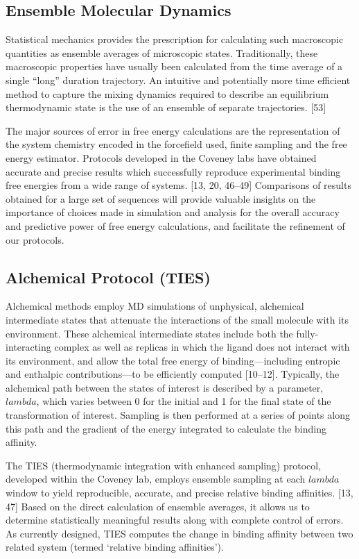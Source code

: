 \documentclass[conference]{IEEEtran}
\begin{document}
\subsection{Ensemble Molecular Dynamics}\label{sec:emd}

Statistical mechanics provides the prescription for calculating such macroscopic quantities as ensemble averages of microscopic states. Traditionally, these macroscopic properties have usually been calculated from the time average of a single “long” duration trajectory. An intuitive and potentially more time efficient method to capture the mixing dynamics required to describe an equilibrium thermodynamic state is the use of an ensemble of separate trajectories. [53]

The major sources of error in free energy calculations are the representation of the system chemistry encoded in the forcefield used, finite sampling and the free energy estimator. Protocols developed in the Coveney labs have obtained accurate and precise results which successfully reproduce experimental binding free energies from a wide range of systems. [13, 20, 46–49] Comparisons of results obtained for a large set of sequences will provide valuable insights on the importance of choices made in simulation and analysis for the overall accuracy and predictive power of free energy calculations, and facilitate the refinement of our protocols. 


\subsection{Alchemical Protocol (TIES)}\label{sec:ties}

Alchemical methods employ MD simulations of unphysical, alchemical intermediate states that attenuate the interactions of the small molecule with its environment. These alchemical intermediate states include both the fully-interacting complex as well as replicas in which the ligand does not interact with its environment, and allow the total free energy of binding—including entropic and enthalpic contributions—to be efficiently computed [10–12]. Typically, the alchemical path between the states of interest is described by a parameter, $lambda$, which varies between 0 for the initial and 1 for the final state of the transformation of interest. Sampling is then performed at a series of points along this path and the gradient of the energy integrated to calculate the binding affinity.

The TIES (thermodynamic integration with enhanced sampling) protocol, developed within the Coveney lab, employs ensemble sampling at each $lambda$ window to yield reproducible, accurate, and precise relative binding affinities. [13, 47] Based on the direct calculation of ensemble averages, it allows us to determine statistically meaningful results along with complete control of errors. As currently designed, TIES computes the change in binding affinity between two related system (termed ‘relative binding affinities’).
\end{document}
